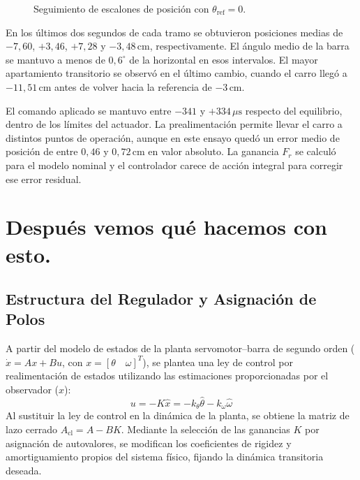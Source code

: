 \documentclass[a4paper, twoside, 10pt, spanish]{article}
\numberwithin{table}{section}
\begin{document}
\begin{figure}[H]
    \centering
    \caption{Seguimiento de escalones de posición con $\theta_{\mathrm{ref}}=0$.}
    \label{fig:seguimiento-referencia-escalones}
\end{figure}

En los últimos dos segundos de cada tramo se obtuvieron posiciones medias de $-7{,}60$, $+3{,}46$, $+7{,}28$ y $-3{,}48\,\mathrm{cm}$, respectivamente. El ángulo medio de la barra se mantuvo a menos de $0{,}6^\circ$ de la horizontal en esos intervalos. El mayor apartamiento transitorio se observó en el último cambio, cuando el carro llegó a $-11{,}51\,\mathrm{cm}$ antes de volver hacia la referencia de $-3\,\mathrm{cm}$.

El comando aplicado se mantuvo entre $-341$ y $+334\,\mu\mathrm{s}$ respecto del equilibrio, dentro de los límites del actuador. La prealimentación permite llevar el carro a distintos puntos de operación, aunque en este ensayo quedó un error medio de posición de entre $0{,}46$ y $0{,}72\,\mathrm{cm}$ en valor absoluto. La ganancia $F_r$ se calculó para el modelo nominal y el controlador carece de acción integral para corregir ese error residual.

\section{Después vemos qué hacemos con esto.}

\subsection{Estructura del Regulador y Asignación de Polos}
A partir del modelo de estados de la planta servomotor--barra de segundo orden ($\dot{x} = A x + B u$, con $x = [\theta \quad \omega]^T$), se plantea una ley de control por realimentación de estados utilizando las estimaciones proporcionadas por el observador ($\hat{x}$):
\begin{equation}
u = -K \hat{x} = -k_\theta \hat{\theta} - k_\omega \hat{\omega}
\end{equation}
Al sustituir la ley de control en la dinámica de la planta, se obtiene la matriz de lazo cerrado $A_{\text{cl}} = A - B K$. Mediante la selección de las ganancias $K$ por asignación de autovalores, se modifican los coeficientes de rigidez y amortiguamiento propios del sistema físico, fijando la dinámica transitoria deseada.
\end{document}
